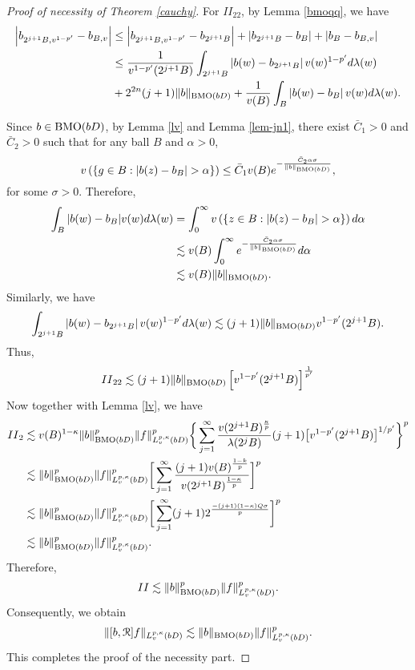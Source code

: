 \documentclass[11pt,a4paper]{amsart}
\numberwithin{equation}{section}
\begin{document}
{\begin{proof}[Proof of necessity of  Theorem \ref{cauchy}]
For ${II}_{22}$,  by Lemma \ref{bmoqq}, we have
\begin{align*}
\left|b_{2^{j+1}B, v^{1-p'}}-b_{B,v}\right|&\leq \left|b_{2^{j+1}B, v^{1-p'}}-b_{2^{j+1}B}\right|+\left|b_{2^{j+1}B}-b_{B}\right|
+\left|b_{B}-b_{B,v}\right|\\
&\leq{1\over v^{1-p'}(2^{j+1}B)}\int_{2^{j+1}B}\left|b(w)-b_{2^{j+1}B}\right|v(w)^{1-p'}d\lambda(w)\\
& +2^{2n}(j+1)\|b\|_{{\rm {BMO}}(bD)}
+{1\over v(B)}\int_{B}\left|b(w)-b_{B}\right|v(w)d\lambda(w).
\end{align*}




Since $b\in {\rm {BMO}}(bD)$, by Lemma \ref{lv} and Lemma  \ref{lem-jn1}, there exist $\bar C_1>0$ and $\bar C_2>0$ such that for any ball $B$ and
$\alpha>0$,
$$v\left( \left\{g\in B: |b(z)-b_B|>\alpha \right\}\right)\leq \bar C_1v(B)e^{-{\bar C_2\alpha\sigma\over\|b\|_{{\rm {BMO}}(bD)}}}, $$
for some $\sigma>0$. Therefore,
\begin{align*}
\int_B |b(w)-b_B|v(w)d\lambda(w)&=\int_{0}^{\infty}v\left(\{z\in B: |b(z)-b_B|>\alpha \} \right)d\alpha\\
&\lesssim v(B)\int_{0}^{\infty}e^{-{\bar C_2\alpha\sigma\over\|b\|_{{\rm {BMO}}(bD)}}} d\alpha\\
&\lesssim v(B)\|b\|_{{\rm {BMO}}(bD)}.
\end{align*}
Similarly, we have
$$\int_{2^{j+1}B}\left|b(w)-b_{2^{j+1}B}\right|v(w)^{1-p'}d\lambda(w)\lesssim (j+1)\|b\|_{{\rm {BMO}}(bD)}v^{1-p'}(2^{j+1}B).$$
Thus,
$${II}_{22}\lesssim (j+1)\|b\|_{{\rm {BMO}}(bD)}\left[v^{1-p'}(2^{j+1}B)\right]^{1\over p'}$$
Now together with Lemma \ref {lv}, we have
\begin{align*}
{II}_2&\lesssim  v(B)^{1-\kappa}\|b\|^p_{{\rm {BMO}}(bD)}\|f\|^p_{L_{v}^{p,\kappa}(bD)}\bigg\{\sum_{j=1}^{\infty}{v(2^{j+1}B)^{\kappa\over p}\over \lambda(2^jB)}(j+1)\big[v^{1-p'}(2^{j+1}B)\big]^{1/p'}
\bigg\}^p\\
 &\lesssim \|b\|^p_{{\rm {BMO}}(bD)}\|f\|^p_{L_{v}^{p,\kappa}(bD)}\bigg[\sum_{j=1}^{\infty}{(j+1)v(B)^{1-k\over p}\over v(2^{j+1}B)^{1-\kappa\over p}}
 \bigg]^p\\
 &\lesssim \|b\|^p_{{\rm {BMO}}(bD)}\|f\|^p_{L_{v}^{p,\kappa}(bD)}\bigg[\sum_{j=1}^{\infty}(j+1) 2^{-(j+1)(1-\kappa)Q\sigma\over p}
 \bigg]^p\\
&\lesssim \|b\|^p_{{\rm {BMO}}(bD)}\|f\|^p_{L_{v}^{p,\kappa}(bD)}.
\end{align*}
\color{black}
Therefore,
$$II\lesssim \|b\|^p_{{\rm {BMO}}(bD)}\|f\|^p_{L_{v}^{p,\kappa}(bD)}.$$
Consequently, we obtain
$$\|[b,\EuScript R]f\|_{L_v^{p,\kappa}(bD)}\lesssim \|b\|_{{\rm BMO} (bD)}\|f\|^p_{L_{v}^{p,\kappa}(bD)}.$$
This completes the proof of  the necessity part.
\end{proof}



}
\end{document}
